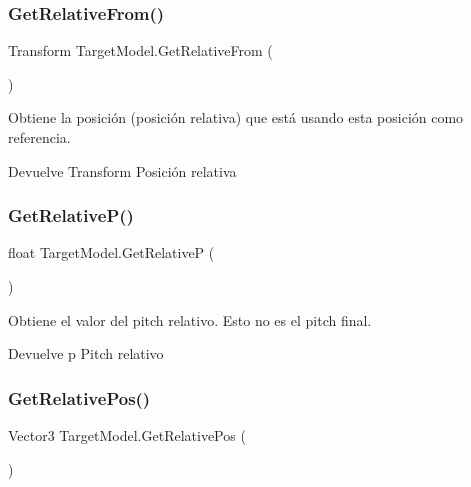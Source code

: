 \subsubsection{\texorpdfstring{GetRelativeFrom()}{GetRelativeFrom()}}
{\footnotesize\ttfamily Transform Target\+Model.\+Get\+Relative\+From (\begin{DoxyParamCaption}{ }\end{DoxyParamCaption})\hspace{0.3cm}{\ttfamily [inline]}}

Obtiene la posición (posición relativa) que está usando esta posición como referencia. \begin{DoxyReturn}{Devuelve}
Transform Posición relativa 
\end{DoxyReturn}
\mbox{\label{class_target_model_a9dd0c95572ab63199d214ae7517c55bf}} 
\subsubsection{\texorpdfstring{GetRelativeP()}{GetRelativeP()}}
{\footnotesize\ttfamily float Target\+Model.\+Get\+RelativeP (\begin{DoxyParamCaption}{ }\end{DoxyParamCaption})\hspace{0.3cm}{\ttfamily [inline]}}

Obtiene el valor del pitch relativo. Esto no es el pitch final. \begin{DoxyReturn}{Devuelve}
p Pitch relativo 
\end{DoxyReturn}
\mbox{\label{class_target_model_a098d820aa132eb79824aa019d1e0a3cb}} 
\subsubsection{\texorpdfstring{GetRelativePos()}{GetRelativePos()}}
{\footnotesize\ttfamily Vector3 Target\+Model.\+Get\+Relative\+Pos (\begin{DoxyParamCaption}{ }\end{DoxyParamCaption})\hspace{0.3cm}{\ttfamily [inline]}}

